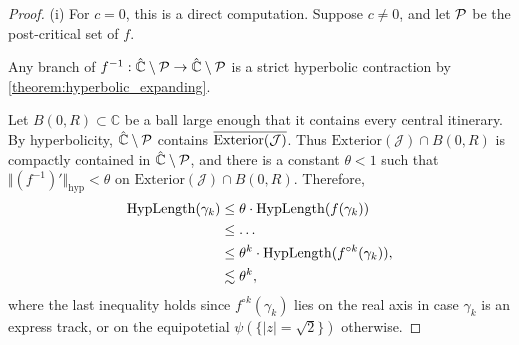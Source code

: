 \begin{proof} \leavevmode
(i) For $c=0$, this is a direct computation. 
Suppose $c \neq 0$, and let $\operatorname{\mathcal P}$ be the post-critical set of $f$.





Any branch of $f^{-1}: \hat{\mathbb C} \setminus \operatorname{\mathcal P} \to \hat{\mathbb C} \setminus \operatorname{\mathcal P}$
is a strict hyperbolic contraction by \cref{theorem:hyperbolic_expanding}.


Let $B(0,R) \subset \mathbb{C}$ be a ball large enough that it contains every central itinerary. 
By hyperbolicity, $\hat{\mathbb C} \setminus \operatorname{\mathcal P}$ contains $\overline{\operatorname{Exterior}(\mathcal{J})}$.
Thus $\mathrm{Exterior}(\mathcal{J}) \cap B(0,R)$ is compactly contained in $\hat{\mathbb C} \setminus \operatorname{\mathcal P}$, and
there is a constant $\theta<1$ such that $\Vert (f^{-1})' \Vert _{\mathrm{hyp}}< \theta$ on $\mathrm{Exterior}(\mathcal{J}) \cap B(0,R)$. Therefore,
\begin{align*}
\operatorname{HypLength}(\gamma_k)  & \leq \theta \cdot \operatorname{HypLength}(f(\gamma_k))\\ & \leq  \dots
	\\ & \leq \theta^k \cdot \operatorname{HypLength}(f^{\circ k}(\gamma_k)),
	\\ & \lesssim \theta^k,
\end{align*}
where the last inequality holds since $f^{\circ k}(\gamma_k)$ lies 
on the real axis in case $\gamma_k$ is an express track, 
or on the equipotetial $\psi(\{ |z| = \sqrt 2\})$ otherwise.


\end{proof}
